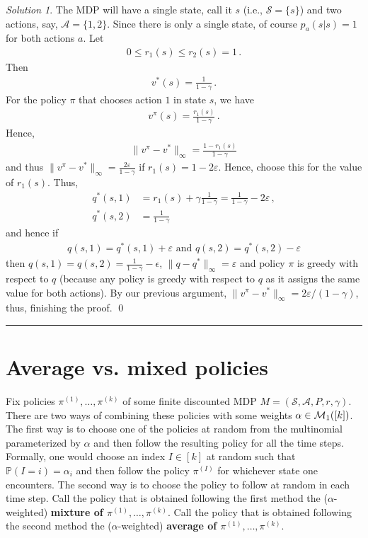 \documentclass{article}
\newcommand{\norm}[1]{\| #1 \|}
\DeclareMathOperator*{\1}{\mathbbm{1}}
\newcommand{\Prob}[1]{\mathbb{P}( #1 )}
\newcommand{\0}{\mathbf{0}}
\theoremstyle{definition}
\theoremstyle{remark}
\newtheorem*{solution*}{Solution}
\theoremstyle{theorem}
\newcommand{\cS}{\mathcal{S}}
\newcommand{\cA}{\mathcal{A}}
\begin{document}
\begin{solution*}
The MDP will have a single state, call it $s$ (i.e., $\cS = \{s\}$) and two actions, say, $\cA = \{1,2\}$.
Since there is only a single state, of course
$p_a(s|s)=1$ for both actions $a$.
Let
\begin{align*}
0\le r_1(s)\le r_2(s)=1\,.
\end{align*}
Then
\begin{align*}
v^*(s) = \frac{1}{1-\gamma}\,.
\end{align*}
For the policy $\pi$ that chooses action $1$ in state $s$, we have
\begin{align*}
v^\pi(s)=\frac{r_1(s)}{1-\gamma}\,.
\end{align*}
Hence,
\begin{align*}
\norm{v^\pi-v^*}_\infty=\frac{1-r_1(s)}{1-\gamma}
\end{align*}
and thus
$\norm{v^\pi-v^*}_\infty=\frac{2\varepsilon}{1-\gamma}$
if $r_1(s) = 1-2\varepsilon$.
Hence, choose this for the value of $r_1(s)$.
Thus,
\begin{align*}
q^*(s,1) &= r_1(s) + \gamma \frac{1}{1-\gamma} = \frac{1}{1-\gamma} - 2 \varepsilon\,,\\
q^*(s,2) &= \frac{1}{1-\gamma}
\end{align*}
and hence if
\begin{align*}
q(s,1) = q^*(s,1)+\varepsilon \text{ and }
q(s,2) = q^*(s,2)-\varepsilon
\end{align*}
then $q(s,1)=q(s,2) = \frac{1}{1-\gamma}-\epsilon$, $\norm{q-q^*}_\infty = \varepsilon$
and policy $\pi$ is greedy with respect to $q$ (because any policy is greedy with respect to $q$ as it assigns the same value for both actions). By our previous argument, $\norm{v^\pi-v^*}_\infty = 2\varepsilon/(1-\gamma)$, thus, finishing the proof.
\qed\par\smallskip\hrule
\end{solution*}

\section*{Average vs. mixed policies}
Fix policies $\pi^{(1)},\dots,\pi^{(k)}$ of some finite discounted MDP $M=(\cS,\cA,P,r,\gamma)$.
There are two ways of combining these policies with
some weights $\alpha\in \mathcal{M}_1([k])$.
The first way is to choose one of the policies at random from the multinomial parameterized by $\alpha$
and then follow the resulting policy for all the time steps.
Formally, one would choose
an index $I\in [k]$ at random such that $\Prob{I=i} = \alpha_i$
and then follow the policy $\pi^{(I)}$ for whichever state one encounters.
The second way is to choose the policy to follow at random in each time step.
Call the policy that is obtained following the first method the ($\alpha$-weighted) \textbf{mixture of $\pi^{(1)},\dots,\pi^{(k)}$}.
Call the policy that is obtained following the second method the ($\alpha$-weighted)
\textbf{average of $\pi^{(1)},\dots,\pi^{(k)}$}.
\end{document}
